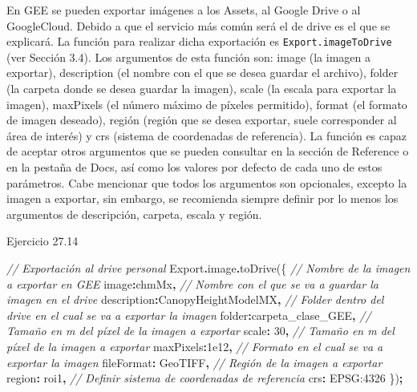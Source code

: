 \documentclass[
  12pt,
  letterpaper,
  twoside]{book}
\newenvironment{Shaded}{\begin{snugshade}}{\end{snugshade}}
\newcommand{\AttributeTok}[1]{\textcolor[rgb]{0.77,0.63,0.00}{#1}}
\newcommand{\CommentTok}[1]{\textcolor[rgb]{0.56,0.35,0.01}{\textit{#1}}}
\newcommand{\DataTypeTok}[1]{\textcolor[rgb]{0.13,0.29,0.53}{#1}}
\newcommand{\DecValTok}[1]{\textcolor[rgb]{0.00,0.00,0.81}{#1}}
\newcommand{\FloatTok}[1]{\textcolor[rgb]{0.00,0.00,0.81}{#1}}
\newcommand{\FunctionTok}[1]{\textcolor[rgb]{0.00,0.00,0.00}{#1}}
\newcommand{\NormalTok}[1]{#1}
\newcommand{\OperatorTok}[1]{\textcolor[rgb]{0.81,0.36,0.00}{\textbf{#1}}}
\newcommand{\StringTok}[1]{\textcolor[rgb]{0.31,0.60,0.02}{#1}}
\begin{document}
En GEE se pueden exportar imágenes a los Assets, al Google Drive o al GoogleCloud. Debido a que el servicio más común será el de drive es el que se explicará. La función para realizar dicha exportación es \texttt{Export.imageToDrive} (ver Sección 3.4). Los argumentos de esta función son: image (la imagen a exportar), description (el nombre con el que se desea guardar el archivo), folder (la carpeta donde se desea guardar la imagen), scale (la escala para exportar la imagen), maxPixels (el número máximo de píxeles permitido), format (el formato de imagen deseado), región (región que se desea exportar, suele corresponder al área de interés) y crs (sistema de coordenadas de referencia). La función es capaz de aceptar otros argumentos que se pueden consultar en la sección de Reference o en la pestaña de Docs, así como los valores por defecto de cada uno de estos parámetros. Cabe mencionar que todos los argumentos son opcionales, excepto la imagen a exportar, sin embargo, se recomienda siempre definir por lo menos los argumentos de descripción, carpeta, escala y región.

Ejercicio 27.14

\begin{Shaded}
\begin{Highlighting}[]
\CommentTok{// Exportación al drive personal}
\NormalTok{Export}\OperatorTok{.}\AttributeTok{image}\OperatorTok{.}\FunctionTok{toDrive}\NormalTok{(\{}
  \CommentTok{// Nombre de la imagen a exportar en GEE}
  \DataTypeTok{image}\OperatorTok{:}\NormalTok{chmMx}\OperatorTok{,} 
  \CommentTok{// Nombre con el que se va a guardar la imagen en el drive}
  \DataTypeTok{description}\OperatorTok{:}\StringTok{\textquotesingle{}CanopyHeightModelMX\textquotesingle{}}\OperatorTok{,}
  \CommentTok{// Folder dentro del drive en el cual se va a exportar la imagen}
  \DataTypeTok{folder}\OperatorTok{:}\StringTok{\textquotesingle{}carpeta\_clase\_GEE\textquotesingle{}}\OperatorTok{,}
  \CommentTok{// Tamaño en m del píxel de la imagen a exportar}
  \DataTypeTok{scale}\OperatorTok{:} \DecValTok{30}\OperatorTok{,}
  \CommentTok{// Tamaño en m del píxel de la imagen a exportar}
  \DataTypeTok{maxPixels}\OperatorTok{:}\FloatTok{1e12}\OperatorTok{,}
  \CommentTok{// Formato en el cual se va a exportar la imagen}
  \DataTypeTok{fileFormat}\OperatorTok{:} \StringTok{\textquotesingle{}GeoTIFF\textquotesingle{}}\OperatorTok{,}
  \CommentTok{// Región de la imagen a exportar}
  \DataTypeTok{region}\OperatorTok{:}\NormalTok{ roi1}\OperatorTok{,}
  \CommentTok{// Definir sistema de coordenadas de referencia}
  \DataTypeTok{crs}\OperatorTok{:} \StringTok{\textquotesingle{}EPSG:4326\textquotesingle{}}
\NormalTok{\})}\OperatorTok{;}
\end{Highlighting}
\end{Shaded}
\end{document}
